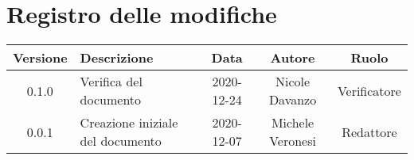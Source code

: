 \section*{Registro delle modifiche}

\begin{center}
	\begin{longtable}{|c|p{5cm}|c|c|c|}
	\hline
	\rowcolor{lighter-grayer}
	\textbf{Versione} & \textbf{Descrizione} & \textbf{Data} & \textbf{Autore} & \textbf{Ruolo} \\
	\hline
	\endfirsthead


	\hline
	0.1.0 & Verifica del documento & 2020-12-24 & Nicole Davanzo & Verificatore \\
	0.0.1 & Creazione iniziale del documento & 2020-12-07 & Michele Veronesi & Redattore \\
	\hline

	\end{longtable}
\end{center}